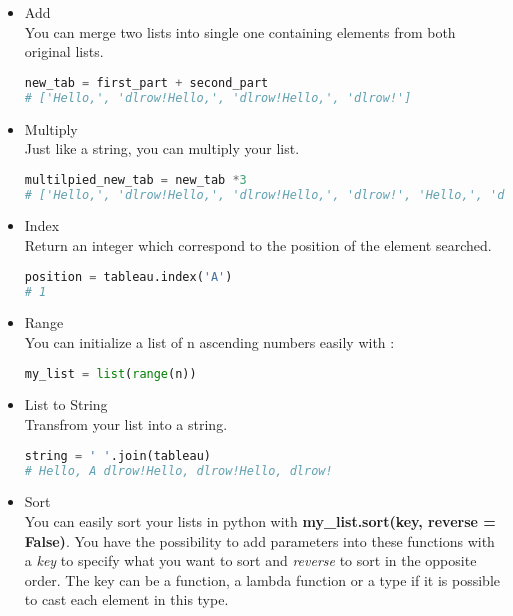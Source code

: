 \documentclass[a4paper, 12pt, titlepage]{scrartcl} %
\begin{document}
\begin{itemize}
\item Add \\
You can merge two lists into single one containing elements from both original lists.
\begin{lstlisting}[language=Python]
new_tab = first_part + second_part
# ['Hello,', 'dlrow!Hello,', 'dlrow!Hello,', 'dlrow!']
\end{lstlisting} \vspace{5mm}

\item Multiply \\
Just like a string, you can multiply your list.
\begin{lstlisting}[language=Python]
multilpied_new_tab = new_tab *3
# ['Hello,', 'dlrow!Hello,', 'dlrow!Hello,', 'dlrow!', 'Hello,', 'dlrow!Hello,', 'dlrow!Hello,', 'dlrow!', 'Hello,', 'dlrow!Hello,', 'dlrow!Hello,', 'dlrow!']
\end{lstlisting} \vspace{5mm}

\item Index \\
Return an integer which correspond to the position of the element searched.
\begin{lstlisting}[language=Python]
position = tableau.index('A')
# 1
\end{lstlisting} \vspace{5mm}

\item Range \\
You can initialize a list of n ascending numbers easily with : 
\begin{lstlisting}[language=Python]
my_list = list(range(n))
\end{lstlisting} \vspace{5mm}

\item List to String \\
Transfrom your list into a string.
\begin{lstlisting}[language=Python]
string = ' '.join(tableau)
# Hello, A dlrow!Hello, dlrow!Hello, dlrow!
\end{lstlisting} \vspace{5mm}

\item Sort \\
\label{Sort}
You can easily sort your lists in python with \textbf{my\_list.sort(key, reverse = False)}. You have the possibility to add parameters into these functions with a \textit{key} to specify what you want to sort and \textit{reverse} to sort in the opposite order. The key can be a function, a lambda function or a type if it is possible to cast each element in this type.


\end{itemize}
\end{document}
